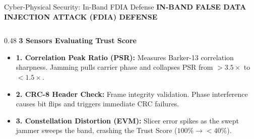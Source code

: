 \documentclass[aspectratio=169, 10pt]{beamer}
\begin{document}
\begin{frame}{Cyber-Physical Security: In-Band FDIA Defense}
  \centering
  \textbf{\color{primaryblue}\small IN-BAND FALSE DATA INJECTION ATTACK (FDIA) DEFENSE}\\[0.10cm]
  
  \vspace{0.30cm}
  \begin{columns}[T]
    \begin{column}{0.48\linewidth}
      \textbf{\color{primaryblue}\normalsize 3 Sensors Evaluating Trust Score}\\[0.10cm]
      \begin{itemize}\setlength{\itemsep}{6pt}\small
        \item \textbf{1. Correlation Peak Ratio (PSR):} Measures Barker-13 correlation sharpness. Jamming pulls carrier phase and collapses PSR from $>3.5\times$ to $<1.5\times$.
        \item \textbf{2. CRC-8 Header Check:} Frame integrity validation. Phase interference causes bit flips and triggers immediate CRC failures.
        \item \textbf{3. Constellation Distortion (EVM):} Slicer error spikes as the swept jammer sweeps the band, crashing the Trust Score ($100\% \rightarrow <40\%$).
      \end{itemize}
    \end{column}
    

\end{columns}
\end{frame}
\end{document}
